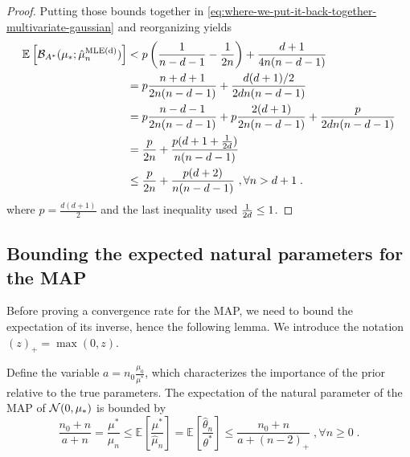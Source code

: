 \documentclass[twoside]{article}
\newcommand*{\expect}[2][]{\ensuremath{\mathbb{E}_{#1} \left[ #2 \right] }} %
\newcommand{\logpart}{A}
\newcommand{\bregmanconj}{\cB_{\logpart^*}}
\newcommand{\nat}{\theta}
\newcommand{\m}{\mu}
\newcommand{\MAPm}{\hat \m_n}
\newcommand{\MAPt}{\hat \nat_n}
\begin{document}
\begin{proof}
Putting those bounds together in 
\cref{eq:where-we-put-it-back-together-multivariate-gaussian}
and reorganizing yields
\begin{align}
 	\expect{\bregmanconj( \mu_*; \hat \mu_n^\text{MLE(d)})}
 	&< p \paren{ \inv{n-d-1} - \inv{2n}}  + \frac{d + 1}{4n(n - d - 1)}\\
 	&= p \frac{n + d +1}{2 n (n-d-1)}  + \frac{d(d + 1)/2}{2dn(n - d - 1)}\\
 	&= p\frac{n-d-1}{2n(n-d-1)} + p\frac{2(d+1)}{2 n (n-d-1)} + \frac{p}{2dn (n - d - 1)}\\
 	&= \frac{p}{2n} + \frac{p(d+ 1 + \inv{2d})}{n (n-d-1)} \\
 	&\leq \frac{p}{2n} + \frac{p(d+2)}{n (n - d -1)}
 	\ , \forall n >d+1 \;.
\end{align}
where $p = \frac{d(d+1)}{2}$ and the last inequality used $\frac{1}{2d}\leq 1$. 
\end{proof}

\subsection{Bounding the expected natural parameters for the MAP}
Before proving a convergence rate for the MAP, we need to bound the expectation of its inverse, hence the following lemma.
We introduce the notation $(z)_+ = \max(0,z)$.
\begin{lemma}\label{lem:expected-map-natural-parameter-gaussian}
	Define the variable $a = n_0 \frac{\mu_0}{\mu^*}$, which characterizes 
	the importance of the prior relative to the true parameters.
	The expectation of the natural parameter of the MAP of ${\mathcal N}(0,\mu_*)$ is bounded by
\begin{equation}
		\frac{n_0+n}{a+n}
		=\frac{\mu^*}{\mu_n}
		\leq \expect{\frac{\mu^*}{\MAPm}} 
		= \expect{\frac{\MAPt}{\nat^*}} 
		\leq
		\frac{n_0 +n}{a+(n-2)_+} \; , \forall n\geq 0 \; .
		\label{eq:lemma_nat_bound}
	\end{equation}
\end{lemma}
\end{document}
